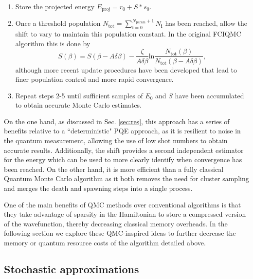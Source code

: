 \documentclass[%
 reprint,
 amsmath,amssymb,
 aps,
]{revtex4-2}
\begin{document}
{\begin{enumerate}
    \item Store the projected energy $E_\mathrm{proj} = r_0 + S * s_0$.
    \item Once a threshold population $N_\mathrm{tot} = \sum_{\mathbf{i}=0}^{N_\mathrm{param} +1} N_\mathbf{i}$ has been reached, allow the shift to vary to maintain this population constant. In { the original FCIQMC algorithm }this is done by\cite{Booth2009}
    \begin{equation}
        S(\beta) = S(\beta - A\delta\beta) - \frac{\zeta}{A\delta\beta}\mathrm{ln}\frac{N_\mathrm{tot}(\beta)}{N_\mathrm{tot}(\beta - A\delta\beta)},
        \label{eq:shift}
    \end{equation}
    { although more recent update procedures have been developed that lead to finer population control and more rapid convergence.\cite{Yang2020}}
    \item Repeat steps 2-5 until sufficient samples of $E_0$ and $S$ have been accumulated to obtain accurate Monte Carlo estimates.
\end{enumerate}
On the one hand, as discussed in Sec. \ref{sec:res}, this approach has a series of benefits relative to a ``deterministic" PQE approach, as it is resilient to noise in the quantum measurement, allowing the use of low shot numbers to obtain accurate results. Additionally, the shift provides a second independent estimator for the energy which can be used to more clearly identify when convergence has been reached. On the other hand, it is more efficient than a fully classical Quantum Monte Carlo algorithm as it both removes the need for cluster sampling and merges the death and spawning steps into a single process.

One of the main benefits of QMC methods over conventional algorithms is that they take advantage of sparsity in the Hamiltonian to store a compressed version of the wavefunction, thereby decreasing classical memory overheads. In the following section we explore these QMC-inspired ideas to further decrease the memory or quantum resource costs of the algorithm detailed above.

\subsection{Stochastic approximations}

}
\end{document}
